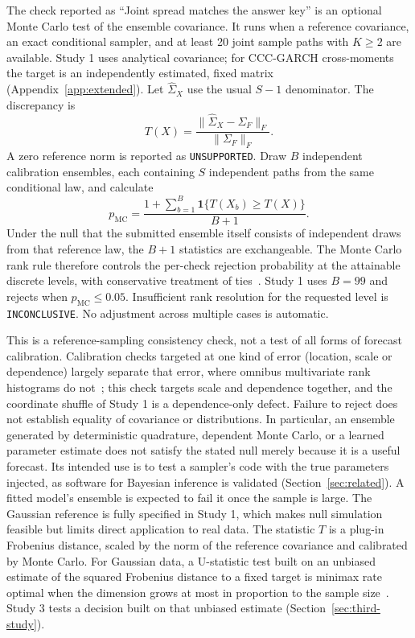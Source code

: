 \documentclass[11pt,a4paper]{article}
\newcommand{\code}[1]{\texttt{#1}}
\begin{document}
The check reported as ``Joint spread matches the answer key'' is an
optional Monte Carlo test of the ensemble covariance. It runs when a
reference covariance, an exact conditional sampler, and at least 20 joint
sample paths with $K\geq2$ are available. Study 1 uses
analytical covariance; for CCC-GARCH cross-moments the target is an
independently estimated, fixed matrix (Appendix~\ref{app:extended}). Let $\widehat\Sigma_X$ use the
usual $S-1$ denominator. The discrepancy is
\begin{equation}
 T(X)=\frac{\|\widehat\Sigma_X-\Sigma_F\|_F}{\|\Sigma_F\|_F}.
\end{equation}
A zero reference norm is reported as \code{UNSUPPORTED}. Draw $B$
independent calibration ensembles, each containing $S$ independent paths
from the same conditional law, and calculate
\begin{equation}
 p_{\mathrm{MC}}=\frac{1+\sum_{b=1}^{B}
                \mathbf{1}\{T(X_b)\geq T(X)\}}{B+1}.
 \label{eq:mc}
\end{equation}
Under the null that the submitted ensemble itself consists of independent
draws from that reference law, the $B+1$ statistics are exchangeable.
The Monte Carlo rank rule therefore controls the per-check rejection
probability at the attainable discrete levels, with conservative treatment
of ties~\cite{hope1968montecarlo}.
Study 1 uses $B=99$ and rejects when $p_{\mathrm{MC}}\leq0.05$.
Insufficient rank resolution for the requested level is
\code{INCONCLUSIVE}. No adjustment across multiple cases is automatic.

This is a reference-sampling consistency check, not a test of all forms of
forecast calibration.
Calibration checks targeted at one kind of error (location, scale or
dependence) largely separate that error, where omnibus multivariate rank
histograms do not~\cite{allen2024assessing}; this check targets scale and
dependence together, and the coordinate shuffle of Study 1 is a
dependence-only defect. Failure to reject does not establish equality of covariance
or distributions. In particular, an ensemble generated by deterministic
quadrature, dependent Monte Carlo, or a learned parameter estimate does
not satisfy the stated null merely because it is a useful forecast.
Its intended use is to test a sampler's code with the true parameters
injected, as software for Bayesian inference is validated
(Section~\ref{sec:related}).
A fitted model's ensemble is expected to fail it once the sample is large.
The Gaussian reference is fully specified in Study 1, which makes
null simulation feasible but limits direct application to real data.
The statistic $T$ is a plug-in Frobenius distance, scaled by the norm of
the reference covariance and calibrated by Monte Carlo. For Gaussian data, a U-statistic test built on an unbiased
estimate of the squared Frobenius distance to a fixed target is minimax
rate optimal when the dimension grows at most in proportion to the sample
size~\cite{cai2013optimal}. Study 3 tests a decision built on that
unbiased estimate (Section~\ref{sec:third-study}).
\end{document}
